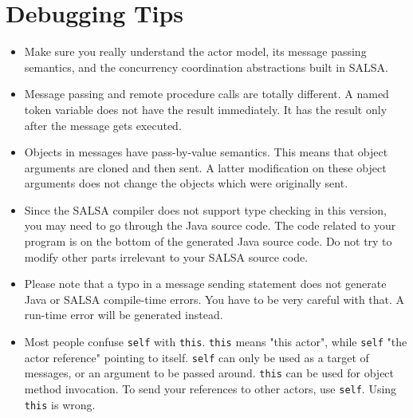 \chapter{Debugging Tips}\label{DebuggingTips} {
\begin{itemize}
\item Make sure you really understand the actor model, its message passing semantics, and
the concurrency coordination abstractions built in SALSA. 

\item Message passing and remote procedure
calls are totally different. A named token variable does not have the 
result immediately. It has the result only after the message gets 
executed.

\item Objects in messages have pass-by-value semantics. This means that object arguments are
cloned and then sent. A latter modification on these object arguments does not change
the objects which were originally sent. 

\item Since the SALSA compiler does not support type checking in this version,
you may need to go through the Java source code. The code related to your
program is on the bottom of the generated Java source code. Do not try 
to modify other parts irrelevant to your SALSA source code.

\item Please note that a typo in a message sending statement does not
generate Java or SALSA compile-time errors. You have to be very careful with that.
A run-time error will be generated instead.

\item Most people confuse {\tt self} with {\tt this}. {\tt this} means "this actor", 
while {\tt self} "the actor reference" pointing to itself. {\tt self} can only be used 
as a target of messages, or an argument to be passed around. {\tt this} can be used for 
object method invocation. To send your references to other actors,
use  {\tt self}. Using {\tt this} is wrong.
\end{itemize}
}

